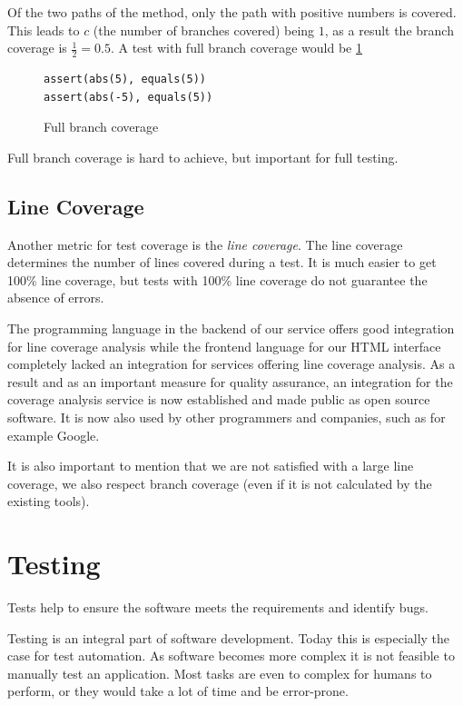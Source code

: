 Of the two paths of the method, only the path with positive numbers is
covered. This leads to $c$ (the number of branches covered) being $1$,
as a result the branch coverage is $\frac{1}{2} = 0.5$. A test with
full branch coverage would be \ref{code:fullBranch}

\begin{figure}
\begin{lstlisting}
assert(abs(5), equals(5))
assert(abs(-5), equals(5))
\end{lstlisting}
\caption{Full branch coverage}
\label{code:fullBranch}
\end{figure}

Full branch coverage is hard to achieve, but important for full testing.

\subsection{Line Coverage}

Another metric for test coverage is the \textit{line coverage}. The line
coverage determines the number of lines covered during a test. It is much
easier to get 100\% line coverage, but tests with 100\% line coverage do
not guarantee the absence of errors.

The programming language in the backend of our service offers good integration
for line coverage analysis while the frontend language for our HTML interface
completely lacked an integration for services offering line coverage analysis.
As a result and as an important measure for quality assurance, an integration
for the coverage analysis service is now established and made public as open
source software. It is now also used by other programmers and companies, such
as for example Google.

It is also important to mention that we are not satisfied with a large line
coverage, we also respect branch coverage (even if it is not calculated by
the existing tools).

\section{Testing}

Tests help to ensure the software meets the requirements and identify bugs.

Testing is an integral part of software development. Today this is especially
the case for test automation. As software becomes more complex it is not
feasible to manually test an application. Most tasks are even to complex for
humans to perform, or they would take a lot of time and be error-prone.

